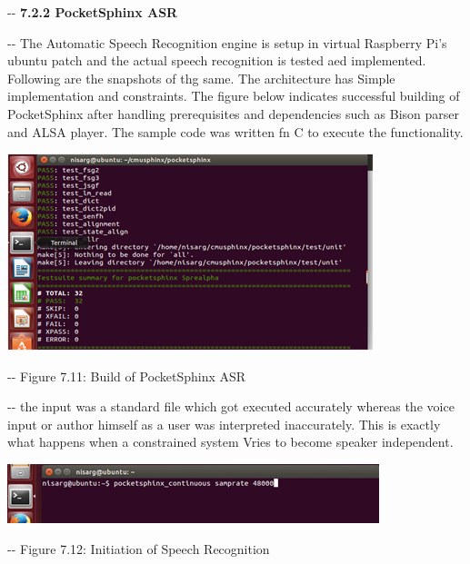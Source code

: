 \documentclass[12pt]{article}
\makeatletter
\newenvironment{indentation}[3]%
	{\par\setlength{\parindent}{#3}
	\setlength{\leftmargin}{#1}       \setlength{\rightmargin}{#2}%
	\advance\linewidth -\leftmargin       \advance\linewidth -\rightmargin%
	\advance\@totalleftmargin\leftmargin  \@setpar{{\@@par}}%
	\parshape 1\@totalleftmargin \linewidth\ignorespaces}{\par}%
\makeatother
\begin{document}
\begin{indentation}{0pt}{0pt}{0pt}
\textbf{7.2.2 PocketSphinx ASR}
\end{indentation}

\begin{indentation}{0pt}{0pt}{0pt}
The Automatic Speech Recognition engine is setup in virtual Raspberry Pi's
ubuntu patch and the actual speech recognition is tested aed implemented.
Following are the snapshots of thg same. The architecture has Simple implementation
and constraints. The figure below indicates successful building of PocketSphinx
after handling prerequisites and dependencies such as Bison parser and ALSA
player. The sample code was written fn C to execute the functionality.
\end{indentation}
\includegraphics[width=302pt]{img-24.png}
\begin{center}
\begin{indentation}{0pt}{0pt}{0pt}
Figure 7.11: Build of PocketSphinx ASR
\end{indentation}
\end{center}

\begin{indentation}{0pt}{0pt}{0pt}
the input was a standard file which got executed accurately whereas the voice
input or author himself as a user was interpreted inaccurately. This is exactly
what happens when a constrained system Vries to become speaker independent.
\end{indentation}
\includegraphics[width=307pt]{img-25.png}
\begin{center}
\begin{indentation}{0pt}{0pt}{0pt}
Figure 7.12: Initiation of Speech Recognition
\end{indentation}
\end{center}
\end{document}
